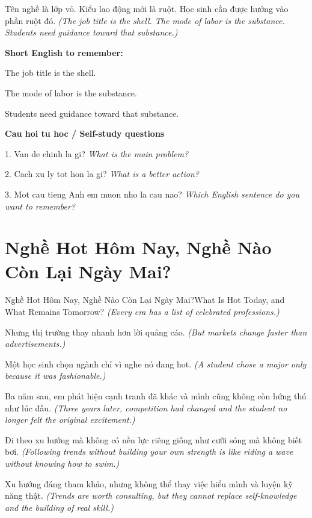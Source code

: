 \begin{baihoc}
Tên nghề là lớp vỏ. Kiểu lao động mới là ruột. Học sinh cần được hướng vào phần ruột đó.
\textit{(The job title is the shell. The mode of labor is the substance. Students need guidance toward that substance.)}
\end{baihoc}

\begin{ghinhoanh}
\textbf{Short English to remember:}

The job title is the shell.

The mode of labor is the substance.

Students need guidance toward that substance.

\end{ghinhoanh}

\begin{tuhocnhanh}
\textbf{Cau hoi tu hoc / Self-study questions}

1. Van de chinh la gi? \textit{What is the main problem?}

2. Cach xu ly tot hon la gi? \textit{What is a better action?}

3. Mot cau tieng Anh em muon nho la cau nao? \textit{Which English sentence do you want to remember?}
\end{tuhocnhanh}
\ngancach

\section{Nghề Hot Hôm Nay, Nghề Nào Còn Lại Ngày Mai?}
\begin{truyen}{Nghề Hot Hôm Nay, Nghề Nào Còn Lại Ngày Mai?}{What Is Hot Today, and What Remains Tomorrow?}
\textit{(Every era has a list of celebrated professions.)}

Nhưng thị trường thay nhanh hơn lời quảng cáo.
\textit{(But markets change faster than advertisements.)}

Một học sinh chọn ngành chỉ vì nghe nó đang hot.
\textit{(A student chose a major only because it was fashionable.)}

Ba năm sau, em phát hiện cạnh tranh đã khác và mình cũng không còn hứng thú như lúc đầu.
\textit{(Three years later, competition had changed and the student no longer felt the original excitement.)}

Đi theo xu hướng mà không có nền lực riêng giống như cưỡi sóng mà không biết bơi.
\textit{(Following trends without building your own strength is like riding a wave without knowing how to swim.)}

Xu hướng đáng tham khảo, nhưng không thể thay việc hiểu mình và luyện kỹ năng thật.
\textit{(Trends are worth consulting, but they cannot replace self-knowledge and the building of real skill.)}

\end{truyen}

